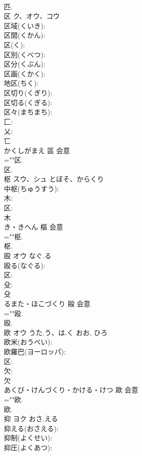 \documentclass[8pt]{extreport}
\begin{document}
\begin{CJK}{UTF8}{min}
\\	匹.
\\	区	ク、オウ、コウ			
\\	区域(くいき): 
\\	区間(くかん): 
\\	区(く): 
\\	区別(くべつ): 
\\	区分(くぶん): 
\\	区画(くかく): 
\\	地区(ちく): 
\\	区切り(くぎり): 
\\	区切る(くぎる): 
\\	区々(まちまち): 
\\	匚: 
\\	乂: 
\\	匸	
\\	かくしがまえ	區	会意 
\\	=""区.
\\	区.
\\	枢	スウ、シュ	とぼそ、からくり		
\\	中枢(ちゅうすう): 
\\	木: 
\\	区: 
\\	木	
\\	き・きへん	樞	会意 
\\	=""枢.
\\	枢.
\\	殴	オウ	なぐ.る		
\\	殴る(なぐる): 
\\	区: 
\\	殳: 
\\	殳	
\\	るまた・ほこづくり	毆	会意 
\\	=""殴.
\\	殴.
\\	欧	オウ	うた.う、は.く	おお, ひろ	
\\	欧米(おうべい): 
\\	欧羅巴(ヨーロッパ): 
\\	区: 
\\	欠: 
\\	欠	
\\	あくび・けんづくり・かける・けつ	歐	会意 
\\	=""欧.
\\	欧.
\\	抑	ヨク	おさ.える		
\\	抑える(おさえる): 
\\	抑制(よくせい): 
\\	抑圧(よくあつ): 

\end{CJK}
\end{document}
